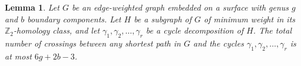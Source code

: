 \documentclass{sig-alternate}
\def\note#1{\EMPH{\color{red} #1}}
\def\Z{\mathbb{Z}}
\newtheorem{lemma}[theorem]{Lemma}
\begin{document}


%
%





\begin{lemma}
\label{L:crossing}
Let $G$ be an edge-weighted graph embedded on a surface with genus $g$ and $b$ boundary components.  Let $H$ be a subgraph of $G$ of minimum weight in its $\Z_2$-homology class, and let $\gamma_1, \gamma_2, \dots, \gamma_r$ be a cycle decomposition of $H$.  The total number of crossings between any shortest path in $G$ and the cycles $\gamma_1, \gamma_2, \dots, \gamma_r$ is at most $6g+2b-3$.
\end{lemma}
\end{document}
